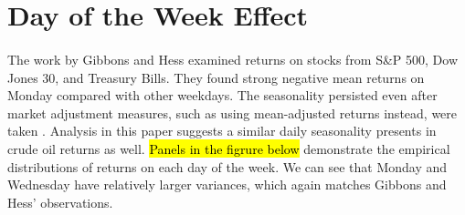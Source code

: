 \documentclass[12pt]{article}
\begin{document}
	\begin{table}
		\small
		\center
		\begin{tabular}
			
		\end{tabular}
		\caption{}
	\end{table}
 
	\section{Day of the Week Effect}
	\paragraph{}The work by Gibbons and Hess examined returns on stocks from S\&P 500, Dow Jones 30, and Treasury Bills. They found strong negative mean returns on Monday compared with other weekdays. The seasonality persisted even after market adjustment measures, such as using mean-adjusted returns instead, were taken \cite{Hess1981}. Analysis in this paper suggests a similar daily seasonality presents in crude oil returns as well.
	\hl{Panels in the figrure below} demonstrate the empirical distributions of returns on each day of the week. We can see that Monday and Wednesday have relatively larger variances, which again matches Gibbons and Hess' observations.
\end{document}
